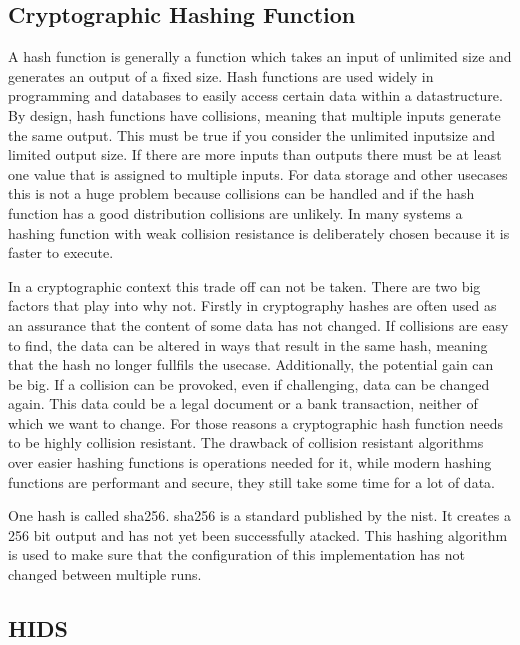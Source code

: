 \documentclass[
	a4paper,					%
	10pt,							%
	twoside,					%
	openright,				%
	notitlepage,			%
	parskip=half,			%
]{scrreprt}					%
\begin{document}
\subsection{Cryptographic Hashing Function}
\label{sec:hashing}

A hash function is generally a function which takes an input of unlimited size and generates an output of a fixed size. Hash functions are used widely in programming and databases to easily access certain data within a datastructure. By design, hash functions have collisions, meaning that multiple inputs generate the same output. This must be true if you consider the unlimited inputsize and limited output size. If there are more inputs than outputs there must be at least one value that is assigned to multiple inputs. For data storage and other usecases this is not a huge problem because collisions can be handled and if the hash function has a good distribution collisions are unlikely. In many systems a hashing function with weak collision resistance is deliberately chosen because it is faster to execute. \cite{hash:noncrypto, hash:slow}

In a cryptographic context this trade off can not be taken. There are two big factors that play into why not. Firstly in cryptography hashes are often used as an assurance that the content of some data has not changed. If collisions are easy to find, the data can be altered in ways that result in the same hash, meaning that the hash no longer fullfils the usecase. Additionally, the potential gain can be big. If a collision can be provoked, even if challenging, data can be changed again. This data could be a legal document or a bank transaction, neither of which we want to change. For those reasons a cryptographic hash function needs to be highly collision resistant. The drawback of collision resistant algorithms over easier hashing functions is operations needed for it, while modern hashing functions are performant and secure, they still take some time for a lot of data. \cite{crypto}

One \gls{hash} is called \gls{sha256}. \gls{sha256} is a standard published by the \gls{nist}. It creates a 256 bit output and has not yet been successfully atacked. \cite{sha} This hashing algorithm is used to make sure that the configuration of this implementation has not changed between multiple runs.


\subsection{HIDS}
\label{sec:def:hids}
\end{document}
